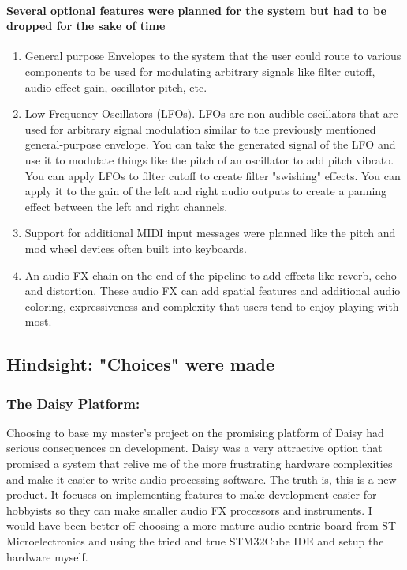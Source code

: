 \documentclass[acmlarge,screen]{acmart}
\begin{document}
	\paragraph{Several optional features were planned for the system but had to be dropped for the sake of time} 
	\begin{enumerate}
		\item General purpose Envelopes to the system that the user could route to various components to be used for modulating arbitrary signals like filter cutoff, audio effect gain, oscillator pitch, etc.
		\item Low-Frequency Oscillators (LFOs). LFOs are non-audible oscillators that are used for arbitrary signal modulation similar to the previously mentioned general-purpose envelope. You can take the generated signal of the LFO and use it to modulate things like the pitch of an oscillator to add pitch vibrato. You can apply LFOs to filter cutoff to create filter "swishing" effects. You can apply it to the gain of the left and right audio outputs to create a panning effect between the left and right channels.
		\item Support for additional MIDI input messages were planned like the pitch and mod wheel devices often built into keyboards.
		\item An audio FX chain on the end of the pipeline to add effects like reverb, echo and distortion. These audio FX can add spatial features and additional audio coloring, expressiveness and complexity that users tend to enjoy playing with most.
	\end{enumerate}
	
	\subsection{Hindsight: "Choices" were made} 
	\subsubsection{The Daisy Platform:} Choosing to base my master's project on the promising platform of Daisy had serious consequences on development. Daisy was a very attractive option that promised a system that relive me of the more frustrating hardware complexities and make it easier to write audio processing software. The truth is, this is a new product. It focuses on implementing features to make development easier for hobbyists so they can make smaller audio FX processors and instruments. I would have been better off choosing a more mature audio-centric board from ST Microelectronics and using the tried and true STM32Cube IDE and setup the hardware myself.
\end{document}
